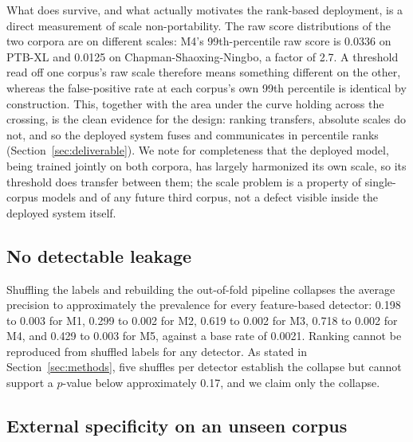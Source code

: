 \documentclass[11pt]{article}
\begin{document}
What does survive, and what actually motivates the rank-based deployment, is a direct measurement of scale non-portability. The raw score distributions of the two corpora are on different scales: M4's 99th-percentile raw score is 0.0336 on PTB-XL and 0.0125 on Chapman-Shaoxing-Ningbo, a factor of 2.7. A threshold read off one corpus's raw scale therefore means something different on the other, whereas the false-positive rate at each corpus's own 99th percentile is identical by construction. This, together with the area under the curve holding across the crossing, is the clean evidence for the design: ranking transfers, absolute scales do not, and so the deployed system fuses and communicates in percentile ranks (Section~\ref{sec:deliverable}). We note for completeness that the deployed model, being trained jointly on both corpora, has largely harmonized its own scale, so its threshold does transfer between them; the scale problem is a property of single-corpus models and of any future third corpus, not a defect visible inside the deployed system itself.

\subsection{No detectable leakage}
\label{sec:perm}

Shuffling the labels and rebuilding the out-of-fold pipeline collapses the average precision to approximately the prevalence for every feature-based detector: 0.198 to 0.003 for M1, 0.299 to 0.002 for M2, 0.619 to 0.002 for M3, 0.718 to 0.002 for M4, and 0.429 to 0.003 for M5, against a base rate of 0.0021. Ranking cannot be reproduced from shuffled labels for any detector. As stated in Section~\ref{sec:methods}, five shuffles per detector establish the collapse but cannot support a $p$-value below approximately 0.17, and we claim only the collapse.

\subsection{External specificity on an unseen corpus}
\label{sec:external}
\end{document}
